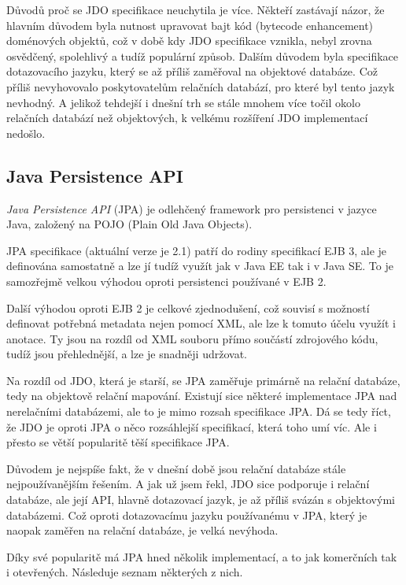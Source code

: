 Důvodů proč se JDO specifikace neuchytila je více. Někteří zastávají názor, že hlavním důvodem byla nutnost upravovat bajt kód (bytecode enhancement) doménových objektů, což v době kdy JDO specifikace vznikla, nebyl zrovna osvědčený, spolehlivý a tudíž populární způsob. Dalším důvodem byla specifikace dotazovacího jazyku, který se až příliš zaměřoval na objektové databáze. Což příliš nevyhovovalo poskytovatelům relačních databází, pro které byl tento jazyk nevhodný. A jelikož tehdejší i dnešní trh se stále mnohem více točil okolo relačních databází než objektových, k velkému rozšíření JDO implementací nedošlo.

\subsection{Java Persistence API}
\emph{Java Persistence API} (JPA) je odlehčený framework pro persistenci v jazyce Java, založený na POJO (Plain Old Java Objects)\cite{projpa2}.

JPA specifikace (aktuální verze je 2.1\cite{jpa:spec}) patří do rodiny specifikací EJB 3, ale je definována samostatně a lze jí tudíž využít jak v Java EE tak i v Java SE. To je samozřejmě velkou výhodou oproti persistenci používané v EJB 2.

Další výhodou oproti EJB 2 je celkové zjednodušení, což souvisí s možností definovat potřebná metadata nejen pomocí XML, ale lze k tomuto účelu využít i anotace. Ty jsou na rozdíl od XML souboru přímo součástí zdrojového kódu, tudíž jsou přehlednější, a lze je snadněji udržovat.

Na rozdíl od JDO, která je starší, se JPA zaměřuje primárně na relační databáze, tedy na objektově relační mapování. Existují sice některé implementace JPA nad nerelačními databázemi, ale to je mimo rozsah specifikace JPA. Dá se tedy říct, že JDO je oproti JPA o něco rozsáhlejší specifikací, která toho umí víc. Ale i přesto se větší popularitě těší specifikace JPA.

Důvodem je nejspíše fakt, že v dnešní době jsou relační databáze stále nejpoužívanějším řešením. A jak už jsem řekl, JDO sice podporuje i relační databáze, ale její API, hlavně dotazovací jazyk, je až příliš svázán s objektovými databázemi. Což oproti dotazovacímu jazyku používanému v JPA, který je naopak zaměřen na relační databáze, je velká nevýhoda.

Díky své popularitě má JPA hned několik implementací, a to jak komerčních tak i otevřených. Následuje seznam některých z nich.

